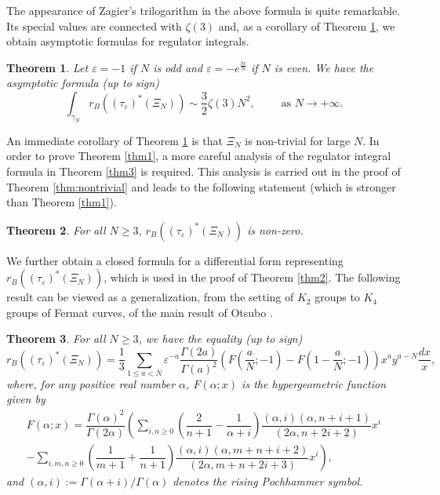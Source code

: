 \documentclass[11pt,a4,leqno]{amsart}
\theoremstyle{my theoremstyle}
\newtheorem{thm}{Theorem}[section]
\theoremstyle{dfn}
\theoremstyle{remark}
\renewcommand{\1}{\mathbbm{1}}
\newcommand{\e}{\varepsilon}
\newcommand{\al}{\alpha}
\numberwithin{equation}{section}
\begin{document}
The appearance of Zagier's trilogarithm in the above formula is quite remarkable. Its special values are connected with $\zeta(3)$ and, as a corollary of Theorem \ref{thm4}, we obtain asymptotic formulas for regulator integrals.

\begin{thm}\label{thm4}
    Let $\e=-1$ if $N$ is odd and $\e=-e^{\frac{\pi i}{N}}$ if $N$ is even. We have the asymptotic formula (up to sign)
    \[
    \int_{\gamma_N} r_B ((\tau_\e)^*(\Xi_N)) \sim \frac{3}{2} \zeta(3) N^2, \qquad \text{ as } N\to +\infty.
    \]
\end{thm}

An immediate corollary of Theorem \ref{thm4} is that $\Xi_N$ is non-trivial for large $N$. In order to prove Theorem \ref{thm1}, a more careful analysis of the regulator integral formula in Theorem \ref{thm3} is required. This analysis is carried out in the proof of Theorem \ref{thm:nontrivial} and leads to the following statement (which is stronger than Theorem \ref{thm1}). 

\begin{thm}\label{thm5}
    For all $N\geq 3$, $r_B ((\tau_\e)^*(\Xi_N))$ is non-zero.
\end{thm}

We further obtain a closed formula for a differential form representing $r_B ((\tau_\e)^*(\Xi_N))$, which is used in the proof of Theorem \ref{thm2}.
The following result can be viewed as a generalization, from the setting of $K_2$ groups to $K_4$ groups of Fermat curves, of the main result of Otsubo \cite[Theorem 4.14]{Ots11}.

\begin{thm}\label{thm6}
For all $N\geq 3$, we have the equality (up to sign) 
\[
r_B ((\tau_\e)^*(\Xi_N))=\dfrac1{3} \sum_{1 \leq a <N} \e^{-a} \frac{\Gamma(2a)}{\Gamma(a)^2} \left(F\left(\dfrac{a}{N};-1 \right) - F\left(1-\dfrac{a}{N};-1 \right)\right)  x^a y^{a-N} \frac{dx}{x},
\]
where, for any positive real number $\al$, $F(\al;  x)$ is the hypergeometric function given by 
\begin{multline*}
F(\al;  x)=  \dfrac{\Gamma\left(\al \right)^2}{\Gamma\left(2 \al \right)}\left( \sum_{i, n \ge 0} \left(\dfrac{2}{n+1} - \dfrac{1}{\al+i} \right) \dfrac{(\al, i)(\al, n+i+1)}{(2\al, n+2i+2)} x^i \right. \\ 
\left. -\sum_{i, m, n \ge 0}  \left(\dfrac1{m+1}+ \dfrac1{n+1} \right) \dfrac{(\al, i)(\al, m+n+i+2) }{(2\al, m+n+2i+3)} x^i \right),
\end{multline*}
and $(\al, i) := \Gamma(\al+i)/\Gamma(\al)$ denotes the rising Pochhammer symbol. 
\end{thm}
\end{document}
